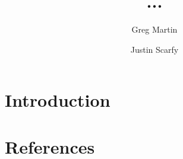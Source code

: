 \documentclass[12pt]{amsart}
\title[Hawking Random Sieves]{...}
\author{Greg Martin}
\author{Justin Scarfy}
\numberwithin{equation}{section}%
\numberwithin{thm}{section} %
\begin{document}
\begin{abstract}
\end{abstract}
\maketitle
\section{Introduction}\label{intro section}

\section{References}
\begin{biblist}

\end{biblist}
\end{document}
